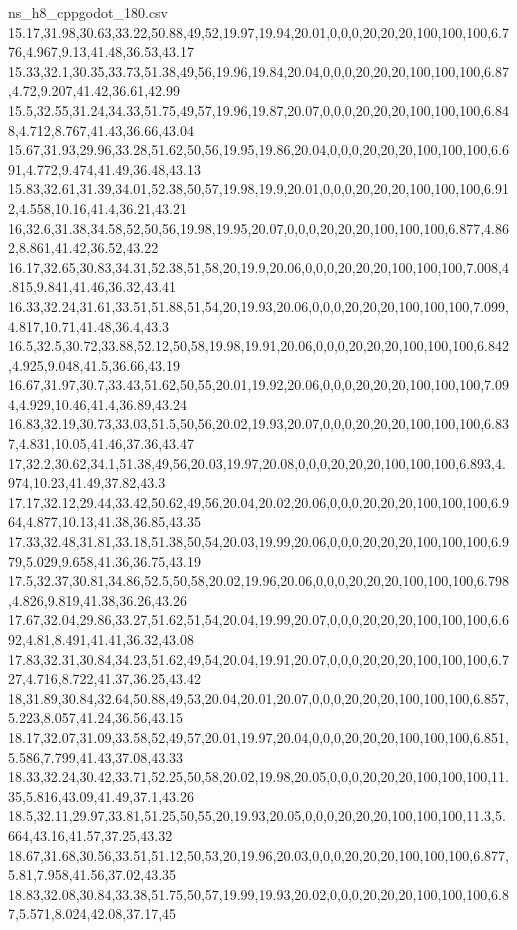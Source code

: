 \begin{filecontents*}[overwrite]{ns_h8_cppgodot_180.csv}
15.17,31.98,30.63,33.22,50.88,49,52,19.97,19.94,20.01,0,0,0,20,20,20,100,100,100,6.776,4.967,9.13,41.48,36.53,43.17
15.33,32.1,30.35,33.73,51.38,49,56,19.96,19.84,20.04,0,0,0,20,20,20,100,100,100,6.87,4.72,9.207,41.42,36.61,42.99
15.5,32.55,31.24,34.33,51.75,49,57,19.96,19.87,20.07,0,0,0,20,20,20,100,100,100,6.848,4.712,8.767,41.43,36.66,43.04
15.67,31.93,29.96,33.28,51.62,50,56,19.95,19.86,20.04,0,0,0,20,20,20,100,100,100,6.691,4.772,9.474,41.49,36.48,43.13
15.83,32.61,31.39,34.01,52.38,50,57,19.98,19.9,20.01,0,0,0,20,20,20,100,100,100,6.912,4.558,10.16,41.4,36.21,43.21
16,32.6,31.38,34.58,52,50,56,19.98,19.95,20.07,0,0,0,20,20,20,100,100,100,6.877,4.862,8.861,41.42,36.52,43.22
16.17,32.65,30.83,34.31,52.38,51,58,20,19.9,20.06,0,0,0,20,20,20,100,100,100,7.008,4.815,9.841,41.46,36.32,43.41
16.33,32.24,31.61,33.51,51.88,51,54,20,19.93,20.06,0,0,0,20,20,20,100,100,100,7.099,4.817,10.71,41.48,36.4,43.3
16.5,32.5,30.72,33.88,52.12,50,58,19.98,19.91,20.06,0,0,0,20,20,20,100,100,100,6.842,4.925,9.048,41.5,36.66,43.19
16.67,31.97,30.7,33.43,51.62,50,55,20.01,19.92,20.06,0,0,0,20,20,20,100,100,100,7.094,4.929,10.46,41.4,36.89,43.24
16.83,32.19,30.73,33.03,51.5,50,56,20.02,19.93,20.07,0,0,0,20,20,20,100,100,100,6.837,4.831,10.05,41.46,37.36,43.47
17,32.2,30.62,34.1,51.38,49,56,20.03,19.97,20.08,0,0,0,20,20,20,100,100,100,6.893,4.974,10.23,41.49,37.82,43.3
17.17,32.12,29.44,33.42,50.62,49,56,20.04,20.02,20.06,0,0,0,20,20,20,100,100,100,6.964,4.877,10.13,41.38,36.85,43.35
17.33,32.48,31.81,33.18,51.38,50,54,20.03,19.99,20.06,0,0,0,20,20,20,100,100,100,6.979,5.029,9.658,41.36,36.75,43.19
17.5,32.37,30.81,34.86,52.5,50,58,20.02,19.96,20.06,0,0,0,20,20,20,100,100,100,6.798,4.826,9.819,41.38,36.26,43.26
17.67,32.04,29.86,33.27,51.62,51,54,20.04,19.99,20.07,0,0,0,20,20,20,100,100,100,6.692,4.81,8.491,41.41,36.32,43.08
17.83,32.31,30.84,34.23,51.62,49,54,20.04,19.91,20.07,0,0,0,20,20,20,100,100,100,6.727,4.716,8.722,41.37,36.25,43.42
18,31.89,30.84,32.64,50.88,49,53,20.04,20.01,20.07,0,0,0,20,20,20,100,100,100,6.857,5.223,8.057,41.24,36.56,43.15
18.17,32.07,31.09,33.58,52,49,57,20.01,19.97,20.04,0,0,0,20,20,20,100,100,100,6.851,5.586,7.799,41.43,37.08,43.33
18.33,32.24,30.42,33.71,52.25,50,58,20.02,19.98,20.05,0,0,0,20,20,20,100,100,100,11.35,5.816,43.09,41.49,37.1,43.26
18.5,32.11,29.97,33.81,51.25,50,55,20,19.93,20.05,0,0,0,20,20,20,100,100,100,11.3,5.664,43.16,41.57,37.25,43.32
18.67,31.68,30.56,33.51,51.12,50,53,20,19.96,20.03,0,0,0,20,20,20,100,100,100,6.877,5.81,7.958,41.56,37.02,43.35
18.83,32.08,30.84,33.38,51.75,50,57,19.99,19.93,20.02,0,0,0,20,20,20,100,100,100,6.87,5.571,8.024,42.08,37.17,45

\end{filecontents*}
